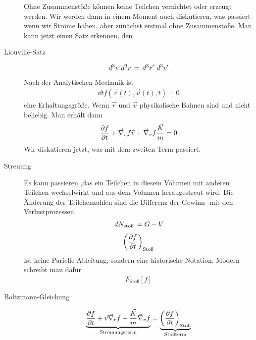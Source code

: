 \begin{description}
    Ohne Zusammenstöße können keine Teilchen vernichtet oder erzeugt werden.
    Wir werden dann in einem Moment auch diskutieren, was passiert wenn wir
    Ströme haben, aber zunächst erstmal ohne Zusammenstöße.
    Man kann jetzt einen Satz erkennen, den
  \item[Liouville-Satz]
    \begin{align*}
      \,d^3 v\, \,d^3 r\, = \,d^3 r'\, \,d^3 v'\,
    \end{align*}
    Nach der Analytischen Mechanik ist
    \begin{align*}
      \dd{}{t} f(\vec{r}(t), \vec{v}(t), t) = 0
    \end{align*}
    eine Erhaltungsgröße. Wenn $\vec{r}$ und $\vec{v}$ physikalische
    Bahnen sind und nicht beliebig.  Man erhält dann
    \begin{align*}
      \frac{\partial f }{\partial t} + \vec{\nabla}_r f \vec{v} + \vec{\nabla}_v f \frac{\vec{K}}{m} = 0
    \end{align*}
    Wir diskutieren jetzt, was mit dem zweiten Term passiert.
  \item[Streuung]
    Es kann passieren ,das ein Teilchen in diesem Volumen mit anderen Teilchen
    wechselwirkt und aus dem Volumen heraugestreut wird. Die Änderung
    der Teilchenzahlen sind die Differenz der Gewinn- mit den Verlustprozessen.
    \begin{align*}
      \,d N_\text{stoß}\, = G - V
    \end{align*}
    \begin{align*}
      \left( \frac{\partial f }{\partial t} \right)_\text{Stoß}
    \end{align*}
    Ist keine Parielle Ableitung, sondern eine historische Notation.
    Modern schreibt man dafür
    \begin{align*}
      F_\text{Stoß} [f]
    \end{align*}
  \item[Boltzmann-Gleichung]
    \begin{align*}
      \underbrace{\frac{\partial f }{\partial t} + \vec{v} \vec{\nabla}_r f + \frac{\vec{K}}{m}
      \vec{\nabla}_v f }_{\text{Strömungsterm}}
      = \underbrace{\left( \frac{\partial f }{\partial t} \right)_\text{Stoß}
    }_{\text{Stoßterm}}
  \end{align*}
\end{description}
